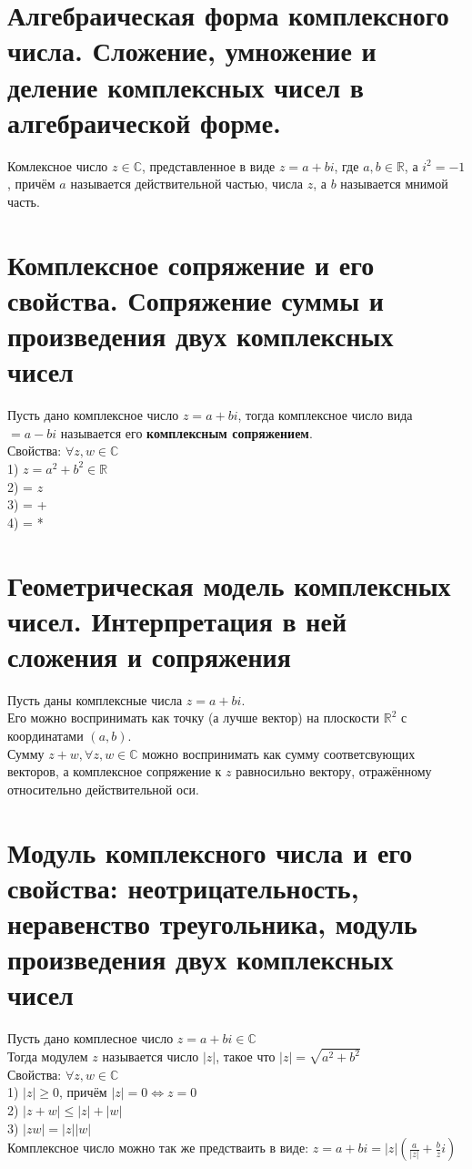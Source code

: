 \documentclass[a4paper,11pt]{report}
\begin{document}
\section{Алгебраическая форма комплексного числа. Сложение, умножение и деление комплексных чисел в алгебраической форме.}
Комлексное число $z \in \mathbb{C}$, представленное в виде $z = a + bi$, где $a, b \in \mathbb{R}$, а $i^2 = -1$,
причём $a$ называется действительной частью, числа $z$, а $b$ называется мнимой часть.\\
\section{Комплексное сопряжение и его свойства. Сопряжение суммы и произведения двух комплексных чисел}
Пусть дано комплексное число $z = a + bi$, тогда комплексное число вида $ = a - bi$ 
называется его \textbf{комплексным сопряжением}.\\
Свойства: $\forall z, w \in \mathbb{C}$\\
1) $z$$ = a^2 + b^2 \in \mathbb{R}$\\
2)  = $z$\\
3)  =  + \\
4)  =  * \\
\section{Геометрическая модель комплексных чисел. Интерпретация в ней сложения и сопряжения}
Пусть даны комплексные числа $z = a + bi$.\\
Его можно воспринимать как точку (а лучше вектор) на плоскости $\mathbb{R}^2$ с координатами $(a, b)$.\\
Сумму $z + w, \forall z, w \in \mathbb{C}$ можно воспринимать как сумму соответсвующих векторов, а
комплексное сопряжение к $z$ равносильно вектору, отражённому относительно действительной оси.
\section{Модуль комплексного числа и его свойства: неотрицательность, неравенство треугольника, модуль произведения
	      двух комплексных чисел}
Пусть дано комплесное число $z = a + bi \in \mathbb{C}$\\
Тогда модулем $z$ называется число $|z|$, такое что $|z| = \sqrt{a^2 + b^2}$\\
Свойства: $\forall z, w \in \mathbb{C}$\\
1) $|z| \geqslant 0$, причём $|z| = 0 \Leftrightarrow z = 0$\\
2) $|z + w| \leqslant |z| + |w|$\\
3) $|zw| = |z||w|$\\
Комплексное число можно так же предстваить в виде: $z = a + bi = |z|(\frac{a}{|z|} + \frac{b}{z}i)$\\
\end{document}
